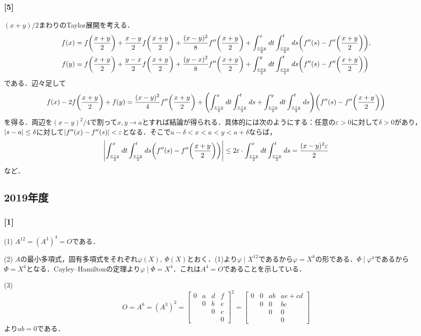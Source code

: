 \documentclass[a4j]{ltjsarticle}
\newcommand{\1}{\mathbbm{1}}
\numberwithin{equation}{section}
\theoremstyle{definition}
\begin{document}
\subsubsection*{[5]}
$(x+y)/2$まわりのTaylor展開を考える．
\begin{align}
    f(x)&=f\qty(\frac{x+y}{2})+\frac{x-y}{2}f\qty(\frac{x+y}{2})+\frac{(x-y)^2}{8}f''\qty(\frac{x+y}{2})+\int^{x}_{\frac{x+y}{2}}dt\int^{t}_{\frac{x+y}{2}}ds\qty(f''(s)-f''\qty(\frac{x+y}{2})),\\
    f(y)&=f\qty(\frac{x+y}{2})+\frac{y-x}{2}f\qty(\frac{x+y}{2})+\frac{(y-x)^2}{8}f''\qty(\frac{x+y}{2})+\int^{y}_{\frac{x+y}{2}}dt\int^{t}_{\frac{x+y}{2}}ds\qty(f''(s)-f''\qty(\frac{x+y}{2}))
\end{align}
である．辺々足して
\begin{equation}
    f(x)-2f\qty(\frac{x+y}{2})+f(y)=\frac{(x-y)^2}{4}f''\qty(\frac{x+y}{2})+\qty(\int^{x}_{\frac{x+y}{2}}dt\int^{t}_{\frac{x+y}{2}}ds+\int^{y}_{\frac{x+y}{2}}dt\int^{t}_{\frac{x+y}{2}}ds)\qty(f''(s)-f''\qty(\frac{x+y}{2}))
\end{equation}
を得る．両辺を$(x-y)^2/4$で割って$x,y\to a$とすれば結論が得られる．具体的には次のようにする：任意の$\varepsilon>0$に対して$\delta>0$があり，$\abs{s-a}\leq \delta$に対して$\abs{f''(x)-f''(s)}< \varepsilon$となる．そこで$a-\delta<x<a<y<a+\delta$ならば，
\begin{equation}
    \abs{\int^{x}_{\frac{x+y}{2}}dt\int^{t}_{\frac{x+y}{2}}ds\qty(f''(s)-f''\qty(\frac{x+y}{2}))}\leq 2\varepsilon\cdot \int^{x}_{\frac{x+y}{2}}dt\int^{t}_{\frac{x+y}{2}}ds=\frac{(x-y)^2\varepsilon}{2}
\end{equation}
など．
\subsection{2019年度}
\subsubsection*{[1]}
(1) $A^{12}=(A^3)^4=O$である．

(2) $A$の最小多項式，固有多項式をそれぞれ$\varphi(X),\ \Phi(X)$とおく．(1)より$\varphi\mid X^{12}$であるから$\varphi=X^k$の形である．$\Phi\mid \varphi^4$であるから$\Phi=X^4$となる．Cayley--Hamiltonの定理より$\varphi\mid \Phi=X^4$．これは$A^4=O$であることを示している．

(3) 
\begin{equation}
    O=A^6=(A^3)^2=\begin{bmatrix}
        0 & a & d & f \\
          & 0 & b & e \\
          &   & 0 & c \\
          &   &   & 0 
    \end{bmatrix}^2=\begin{bmatrix}
        0 & 0 & ab & ae+cd \\
          & 0 & 0  & bc \\
          &   & 0  & 0 \\
          &   &    & 0 
    \end{bmatrix}
\end{equation}
より$ab=0$である．
\end{document}
